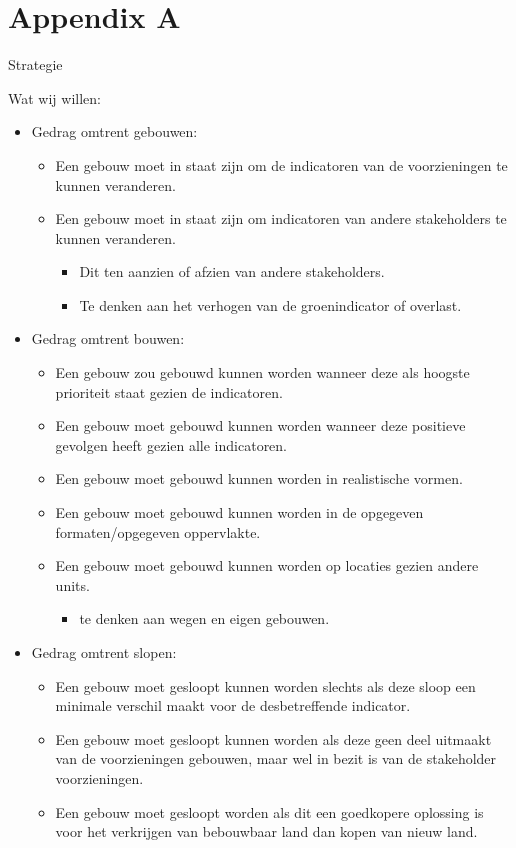 \section{Appendix A}
Strategie

Wat wij willen:\\
\begin{itemize}
	\item Gedrag omtrent gebouwen:
	\begin{itemize}
		\item 	Een gebouw moet in staat zijn om de indicatoren van de voorzieningen te kunnen veranderen.
		\item Een gebouw moet in staat zijn om indicatoren van andere stakeholders te kunnen veranderen.
		\begin{itemize}
			\item Dit ten aanzien of afzien van andere stakeholders.
			\item Te denken aan het verhogen van de groenindicator of overlast.
		\end{itemize}
	
	\end{itemize}

	\item Gedrag omtrent bouwen:
	\begin{itemize}
		\item Een gebouw zou gebouwd kunnen worden wanneer deze als hoogste prioriteit staat gezien de indicatoren.
		\item Een gebouw moet gebouwd kunnen worden wanneer deze positieve gevolgen heeft gezien alle indicatoren.
		\item Een gebouw moet gebouwd kunnen worden in realistische vormen.
		\item Een gebouw moet gebouwd kunnen worden in de opgegeven formaten/opgegeven oppervlakte.
		\item Een gebouw moet gebouwd kunnen worden op locaties gezien andere units.
		\begin{itemize}
			\item te denken aan wegen en eigen gebouwen.
		\end{itemize}
	\end{itemize}
	
	\item Gedrag omtrent slopen:
	\begin{itemize}
		\item Een gebouw moet gesloopt kunnen worden slechts als deze sloop een minimale verschil maakt voor de desbetreffende indicator.
		\item Een gebouw moet gesloopt kunnen worden als deze geen deel uitmaakt van de voorzieningen gebouwen, maar wel in bezit is van de stakeholder voorzieningen.
		\item Een gebouw moet gesloopt worden als dit een goedkopere oplossing is voor het verkrijgen van bebouwbaar land dan kopen van nieuw land.
	\end{itemize}
	

\end{itemize}
